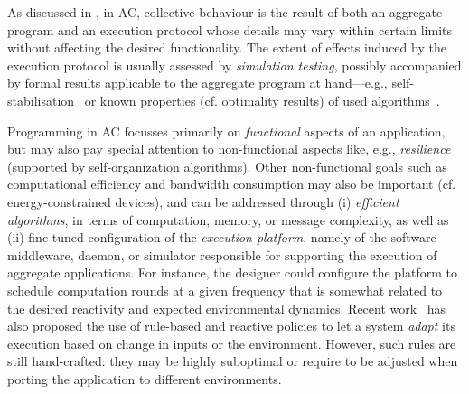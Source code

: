 As discussed in ,
 in \ac{AC}, collective behaviour 
 is the result of both
 an aggregate program
 and an execution protocol
 whose details may vary within certain limits
 without affecting the desired functionality.
%
The extent of effects induced by the execution protocol
 is usually assessed by \emph{simulation testing},
 possibly accompanied by formal results applicable to the aggregate program at hand---e.g., self-stabilisation~\cite{DBLP:journals/tomacs/ViroliABDP18}
  or known properties (cf. optimality results) of used algorithms~\cite{DBLP:conf/saso/AudritoCDV17,DBLP:journals/cee/AudritoCDPV21}.

Programming in \ac{AC}
 focusses primarily on \emph{functional} aspects of an application,
 but may also pay special attention to non-functional aspects like, e.g., \emph{resilience} (supported by self-organization algorithms).
%
Other non-functional goals such as computational efficiency and bandwidth consumption may also be important (cf. energy-constrained devices), 
 and can be addressed through (i) \emph{efficient algorithms}, in terms of computation, memory, or message complexity,
 as well as 
 (ii) fine-tuned configuration of the \emph{execution platform}, namely of the software middleware, daemon, or simulator responsible for supporting the execution of aggregate applications. 
%
%
%
For instance, the designer could configure the platform 
 to schedule computation rounds 
 at a given frequency
 that is somewhat related to the desired reactivity
 and expected environmental dynamics.
%
Recent work~\cite{danilo2021lmcs} has also proposed the use of rule-based and reactive policies to let a system \emph{adapt} its execution based on change in inputs or the environment.
%
However, such rules are still hand-crafted: they may be highly suboptimal or require to be adjusted when porting the application to different environments.
%

%
% 

